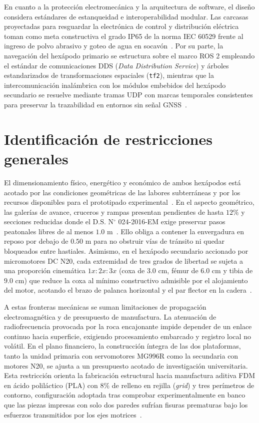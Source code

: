 En cuanto a la protección electromecánica y la arquitectura de software, el diseño considera estándares de estanqueidad e interoperabilidad modular. Las carcasas proyectadas para resguardar la electrónica de control y distribución eléctrica toman como meta constructiva el grado IP65 de la norma IEC 60529 frente al ingreso de polvo abrasivo y goteo de agua en socavón~\cite{AdvancesMining_2023, OSINERGMIN_BoletinGSM_2020}. Por su parte, la navegación del hexápodo primario se estructura sobre el marco ROS 2 empleando el estándar de comunicaciones DDS (\textit{Data Distribution Service}) y árboles estandarizados de transformaciones espaciales (\texttt{tf2}), mientras que la intercomunicación inalámbrica con los módulos embebidos del hexápodo secundario se resuelve mediante tramas UDP con marcas temporales consistentes para preservar la trazabilidad en entornos sin señal GNSS~\cite{siciliano2010robotics, KimChoi_2025_MineMapping}.

\section{Identificación de restricciones generales}

El dimensionamiento físico, energético y económico de ambos hexápodos está acotado por las condiciones geométricas de las labores subterráneas y por los recursos disponibles para el prototipado experimental~\cite{MINEM_DS024_2016, OSINERGMIN_BoletinGSM_2020}. En el aspecto geométrico, las galerías de avance, cruceros y rampas presentan pendientes de hasta $12\%$ y secciones reducidas donde el D.S. N$^\circ$ 024-2016-EM exige preservar pasos peatonales libres de al menos $1.0\text{ m}$~\cite{MINEM_DS024_2016}. Ello obliga a contener la envergadura en reposo por debajo de $0.50\text{ m}$ para no obstruir vías de tránsito ni quedar bloqueados entre hastiales. Asimismo, en el hexápodo secundario accionado por micromotores DC N20, cada extremidad de tres grados de libertad se sujeta a una proporción cinemática $1x : 2x : 3x$ (coxa de $3.0\text{ cm}$, fémur de $6.0\text{ cm}$ y tibia de $9.0\text{ cm}$) que reduce la coxa al mínimo constructivo admisible por el alojamiento del motor, acotando el brazo de palanca horizontal y el par flector en la cadera~\cite{InsectInspired_2020, Wu2024_SpiderLegDesign}.

A estas fronteras mecánicas se suman limitaciones de propagación electromagnética y de presupuesto de manufactura. La atenuación de radiofrecuencia provocada por la roca encajonante impide depender de un enlace continuo hacia superficie, exigiendo procesamiento embarcado y registro local no volátil. En el plano financiero, la construcción íntegra de las dos plataformas, tanto la unidad primaria con servomotores MG996R como la secundaria con motores N20, se ajusta a un presupuesto acotado de investigación universitaria. Esta restricción orienta la fabricación estructural hacia manufactura aditiva FDM en ácido poliláctico (PLA) con $8\%$ de relleno en rejilla (\textit{grid}) y tres perímetros de contorno, configuración adoptada tras comprobar experimentalmente en banco que las piezas impresas con solo dos paredes sufrían fisuras prematuras bajo los esfuerzos transmitidos por los ejes motrices~\cite{Anderson2017_PLA, MahovicPoljacek2025_PLA}.


